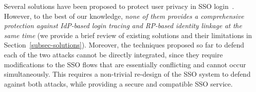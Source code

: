 
Several solutions have been proposed to protect user privacy in SSO login~\cite{maler2008venn,NIST2017draft,BrowserID,SPRESSO}. However, to the best of our knowledge, {\em none of them provides a comprehensive protection against IdP-based login tracing and RP-based identity linkage at the same time} (we provide a brief review of existing solutions and their limitations in Section~\ref{subsec-solutions}). Moreover, the techniques proposed so far to defend each of the two attacks cannot be directly integrated, since they require modifications to the SSO flows that are essentially conflicting and cannot occur simultaneously. This requires a non-trivial re-design of the SSO system to defend against both attacks,
while providing a secure and compatible SSO service.

